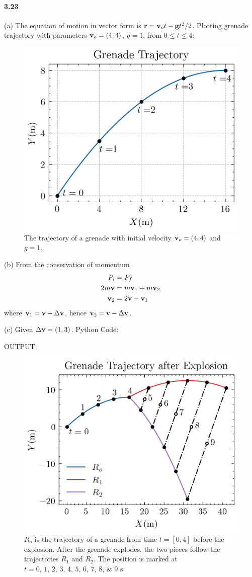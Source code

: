 \documentclass[../problems.tex]{subfiles}
\begin{document}
\paragraph{3.23}
(a) The equation of motion in vector form is $\vb{r} = \vb{v}_ot - \vb{g} t^2/2$. 
Plotting grenade trajectory with parameters $\vb{v}_o = (4,4)$, $g = 1$, from $0\le t\le 4$:
\begin{figure} [ht]
    \centering
    \includegraphics[width=0.5\linewidth]{../images/fig3_23a.png}
    \captionsetup{width=0.7\linewidth}
    \caption{The trajectory of a grenade with initial velocity $\vb{v}_o = (4,4)$ and $g = 1$.}
    \label{fig:3_23}
\end{figure}

(b) From the conservation of momentum
\begin{align*}
    P_i &= P_f \\
    2m\vb{v} &= m\vb{v}_1 + m\vb{v}_2 \\
    \vb{v}_2 &= 2\vb{v} - \vb{v}_1
\end{align*}
where $\vb{v}_1 = \vb{v} + \Delta \vb{v}$, hence $\vb{v}_2 = \vb{v} - \Delta\vb{v}$. 

(c) Given $\Delta\vb{v} = (1,3)$. Python Code:

OUTPUT:
\begin{figure}[ht]
    \centering
    \includegraphics[width=0.5\linewidth]{../images/fig3_23b.png}
    \captionsetup{width=0.8\linewidth}
    \caption{$R_o$ is the trajectory of a grenade from time $t = [0,4]$ before the explosion. After
    the grenade explodes, the two pieces follow the trajectories $R_1$ and $R_2$. The position is
    marked at $t = \numlist{0;1;2;3;4;5;6;7;8;9}$ s.}
    \label{fig:3_23c}
\end{figure}
\end{document}
